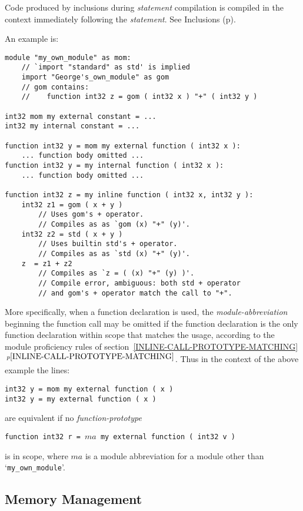 \documentclass[12pt]{article}
\newcommand{\itemref}[1]{\ref{#1}$\,^{p\pageref{#1}}$}
\newcommand{\pagref}[1]{p\pageref{#1}}
\newenvironment{indpar}[1][0.3in]%
	{\begin{list}{}%
		     {\setlength{\itemsep}{0in}%
		      \setlength{\topsep}{0in}%
		      \setlength{\parsep}{1ex}%
		      \setlength{\labelwidth}{#1}%
		      \setlength{\leftmargin}{#1}%
		      \addtolength{\leftmargin}{\labelsep}}%
	 \item}%
	{\end{list}}
\begin{document}
Code produced by inclusions during {\em statement} compilation
is compiled in the context immediately following
the {\em statement}.  See Inclusions (\pagref{INCLUSIONS}).

An example is:
\begin{indpar}\begin{verbatim}
module "my_own_module" as mom:
    // `import "standard" as std' is implied
    import "George's_own_module" as gom
    // gom contains:
    //    function int32 z = gom ( int32 x ) "+" ( int32 y )

int32 mom my external constant = ...
int32 my internal constant = ...

function int32 y = mom my external function ( int32 x ):
    ... function body omitted ...
function int32 y = my internal function ( int32 x ):
    ... function body omitted ...

function int32 z = my inline function ( int32 x, int32 y ):
    int32 z1 = gom ( x + y )
        // Uses gom's + operator.
        // Compiles as as `gom (x) "+" (y)'.
    int32 z2 = std ( x + y )
        // Uses builtin std's + operator.
        // Compiles as as `std (x) "+" (y)'.
    z  = z1 + z2 
        // Compiles as `z = ( (x) "+" (y) )'.
        // Compile error, ambiguous: both std + operator
        // and gom's + operator match the call to "+".
\end{verbatim}\end{indpar}\label{EXTERNAL-INTERNAL-EXAMPLE}

More specifically,
when a function declaration is used, the {\em module-abbreviation}
beginning the function call may be omitted if the function declaration is
the only function declaration within scope that matches the usage,
according to the module proficiency rules of
section~\itemref{INLINE-CALL-PROTOTYPE-MATCHING}.
Thus in the context of the above example the lines:
\begin{indpar}\begin{verbatim}
int32 y = mom my external function ( x )
int32 y = my external function ( x )
\end{verbatim}\end{indpar}
are equivalent if no {\em function-prototype}
\begin{center}
\tt function int32 r = $ma$ my external function ( int32 v )
\end{center}
is in scope, where $ma$ is a module abbreviation for a module
other than `{\tt my\_own\_module}'.

\subsection{Memory Management}
\label{MEMORY-MANAGEMENT}
\end{document}
